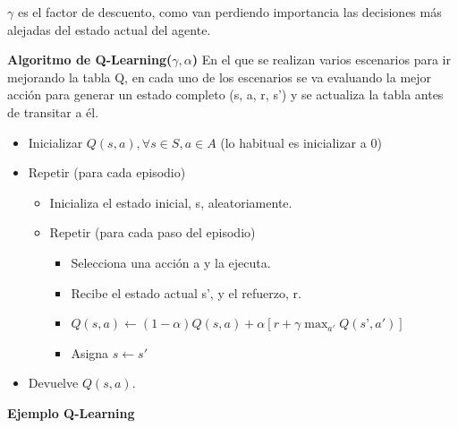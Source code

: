 \documentclass[12pt, twoside, openright]{report} %
\begin{document}
$\gamma$ es el factor de descuento, como van perdiendo importancia las decisiones más alejadas del estado actual del agente.

\textbf{Algoritmo de Q-Learning($\gamma, \alpha$)}
En el que se realizan varios escenarios para ir mejorando la tabla Q, en cada uno de los escenarios se va evaluando la mejor acción para generar un estado completo (s, a, r, s') y se actualiza la tabla antes de transitar a él.
\begin{itemize}
  \item Inicializar $Q(s, a), \forall s \in S, a \in A$ (lo habitual es inicializar a 0)
  \item Repetir (para cada episodio)
  \begin{itemize}
    \item Inicializa el estado inicial, s, aleatoriamente.
    \item Repetir (para cada paso del episodio)
    \begin{itemize}
      \item Selecciona una acción a y la ejecuta.
      \item Recibe el estado actual s', y el refuerzo, r.
      \item $Q(s, a) \leftarrow (1-\alpha) Q(s, a) + \alpha[r + \gamma \max_{a'} Q(s’, a')]$      
      \item Asigna $s \leftarrow s'$
    \end{itemize}
  \end{itemize}
  \item Devuelve $Q(s, a)$.
\end{itemize}

\textbf{Ejemplo Q-Learning}
\end{document}
